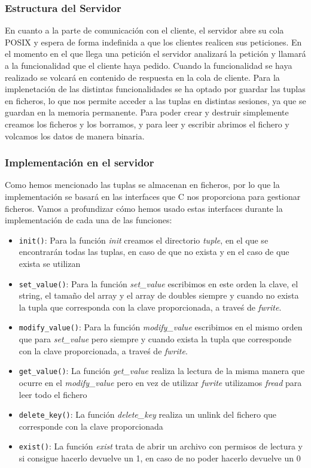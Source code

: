 \documentclass[]{article}
\begin{document}
\subsubsection{Estructura del Servidor}
\label{subsec::estructura_servidor}
En cuanto a la parte de comunicación con el cliente, el servidor abre su cola POSIX y espera de forma indefinida a que los clientes realicen sus peticiones. En el momento en el que llega una petición el servidor analizará la petición y llamará a la funcionalidad que el cliente haya pedido. Cuando la funcionalidad se haya realizado se volcará en contenido de respuesta en la cola de cliente.
Para la implenetación de las distintas funcionalidades se ha optado por guardar las tuplas en ficheros, lo que nos permite acceder a las tuplas en distintas sesiones, ya que se guardan en la memoria permanente.
Para poder crear y destruir simplemente creamos los ficheros y los borramos, y para leer y escribir abrimos el fichero y volcamos los datos de manera binaria.

\subsubsection*{Implementación en el servidor}
\label{subsec::implementacion_servidor}
Como hemos mencionado las tuplas se almacenan en ficheros, por lo que la implementación se basará en las interfaces que C nos proporciona para gestionar ficheros.
Vamos a profundizar cómo hemos usado estas interfaces durante la implementación de cada una de las funciones:

\begin{itemize}
  \item \texttt{init()}: Para la función \textit{init} creamos el directorio \textit{tuple}, en el que se encontrarán todas las tuplas, en caso de que no exista y en el caso de que exista se utilizan 
  \item \texttt{set\_value()}: Para la función \textit{set\_value} escribimos en este orden la clave, el string, el tamaño del array y el array de doubles siempre y cuando no exista la tupla que corresponda con la clave proporcionada, a traveś de \textit{fwrite}.
  \item \texttt{modify\_value()}: Para la función \textit{modify\_value} escribimos en el mismo orden que para \textit{set\_value} pero siempre y cuando exista la tupla que corresponde con la clave proporcionada, a traveś de \textit{fwrite}.
  \item \texttt{get\_value()}: La función \textit{get\_value} realiza la lectura de la misma manera que ocurre en el \textit{modify\_value} pero en vez de utilizar \textit{fwrite} utilizamos \textit{fread} para leer todo el fichero
  \item \texttt{delete\_key()}: La función \textit{delete\_key} realiza un unlink del fichero que corresponde con la clave proporcionada
  \item \texttt{exist()}: La función \textit{exist} trata de abrir un archivo con permisos de lectura y si consigue hacerlo devuelve un 1, en caso de no poder hacerlo devuelve un 0
\end{itemize}
\end{document}
